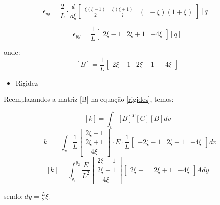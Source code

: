 \documentclass{article} %
\begin{document}
\begin{equation*}
\epsilon_{yy}=\frac{2}{L}\cdot\frac{d}{d\xi}\begin{bmatrix}
\frac{\xi(\xi-1)}{2}&\frac{\xi(\xi+1)}{2}&(1-\xi)(1+\xi)
\end{bmatrix}[q]
\end{equation*}

\begin{equation}\label{deforma2}
\epsilon_{yy}=\frac{1}{L}\begin{bmatrix}
2\xi-1&2\xi+1&-4\xi
\end{bmatrix}[q]
\end{equation}

\indent onde:
\begin{equation}\label{matrizb2}
[B]=\frac{1}{L}\begin{bmatrix}
2\xi-1&2\xi+1&-4\xi
\end{bmatrix}
\end{equation}



\begin{itemize}
	\item Rigidez
\end{itemize}

\indent Reemplazandos a matriz [B] na equação \ref{rigidez}, temos:

 \begin{equation*}\label{}
[k]= \int_{v}[B]^T[C][B]dv
\end{equation*}
\begin{equation*}\label{}
[k]= \int_{v}\frac{1}{L}\begin{bmatrix}
2\xi-1\\2\xi+1\\-4\xi
\end{bmatrix}\cdot E\cdot \frac{1}{L}\begin{bmatrix}
-2\xi-1&2\xi+1&-4\xi
\end{bmatrix}dv
\end{equation*}
\begin{equation*}\label{}
[k]= \int_{y_1}^{y_2}\frac{E}{L^2}\begin{bmatrix}
2\xi-1\\2\xi+1\\-4\xi
\end{bmatrix}\begin{bmatrix}
2\xi-1&2\xi+1&-4\xi
\end{bmatrix}Ady
\end{equation*}

\indent sendo: \(dy=\frac{L}{2}\xi\).
\end{document}

